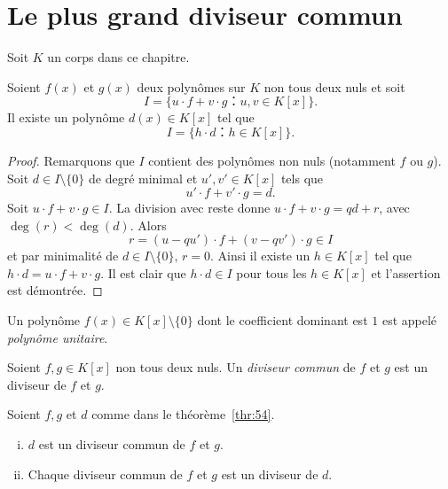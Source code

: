 \section{Le plus grand diviseur commun}
\label{sec:fact-de-polyn}

Soit $K$ un corps dans ce chapitre. 

\begin{theorem}
  \label{thr:54}
  Soient $f(x)$ et $g(x)$ deux polynômes sur $K$ non tous deux nuls et soit 
  \begin{displaymath}
    I = \{ u ⋅ f + v ⋅ g ： u,v ∈ K[x]\}.
  \end{displaymath}
  Il existe un  polynôme $d(x)∈K[x]$ tel que
  \begin{equation}
    \label{eq:51}
    I = \{ h ⋅ d ： h ∈ K[x]\}. 
  \end{equation}
\end{theorem}

\begin{proof}
  Remarquons que $I$ contient des polynômes non nuls (notamment $f$ ou $g$). Soit $d ∈ I \setminus \{0\}$ de degré minimal et $u',v' ∈ K[x]$ tels que
  \begin{displaymath}
    u' ⋅ f + v' ⋅g = d. 
  \end{displaymath}
  Soit $u⋅f + v⋅ g ∈ I$. La division avec reste donne $u⋅f + v⋅ g = qd +r$, avec $\deg(r) < \deg(d)$. Alors
  \begin{displaymath}
    r = (u - qu') ⋅ f + (v - qv') ⋅ g ∈ I
  \end{displaymath}
  et par minimalité de $d ∈ I \setminus\{0\}$, $r=0$. Ainsi il existe un $h∈K[x]$ tel que $h⋅d =  u⋅f + v⋅ g$. Il est clair que $h⋅d ∈I$ pour tous les $h ∈K[x]$ et l'assertion est démontrée.   
\end{proof}


\begin{definition}
  \label{def:54}
  Un polynôme $f(x) ∈ K[x] \setminus \{0\}$  dont le coefficient dominant est $1$ est appelé \emph{polynôme unitaire}. 
\end{definition}


\begin{definition}
  \label{def:55}
  Soient $f,g ∈ K[x]$ non tous deux nuls. Un \emph{diviseur commun} de $f$ et $g$  est un diviseur de $f$ et $g$. 
\end{definition}

\begin{theorem}
  \label{thr:55}
  Soient $f, g$ et $d$  comme dans le  théorème~\ref{thr:54}.
  \begin{enumerate}[i)]
  \item $d$ est un diviseur commun de $f$ et $g$. \label{item:24}
  \item Chaque diviseur commun de $f$ et $g$ est un diviseur de $d$. \label{item:25}
  \end{enumerate}
\end{theorem}

